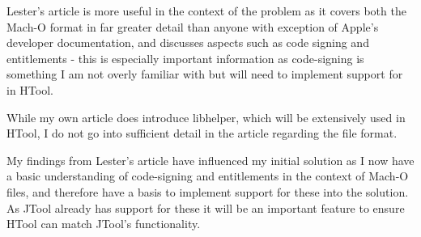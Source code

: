 Lester's article is more useful in the context of the problem as it covers both the Mach-O format in far greater detail than anyone with exception of Apple's developer documentation, and discusses aspects such as code signing and entitlements - this is especially important information as code-signing is something I am not overly familiar with but will need to implement support for in HTool.

While my own article does introduce libhelper, which will be extensively used in HTool, I do not go into sufficient detail in the article regarding the file format.


My findings from Lester's article have influenced my initial solution as I now have a basic understanding of code-signing and entitlements in the context of Mach-O files, and therefore have a basis to implement support for these into the solution. As JTool already has support for these it will be an important feature to ensure HTool can match JTool's functionality.





